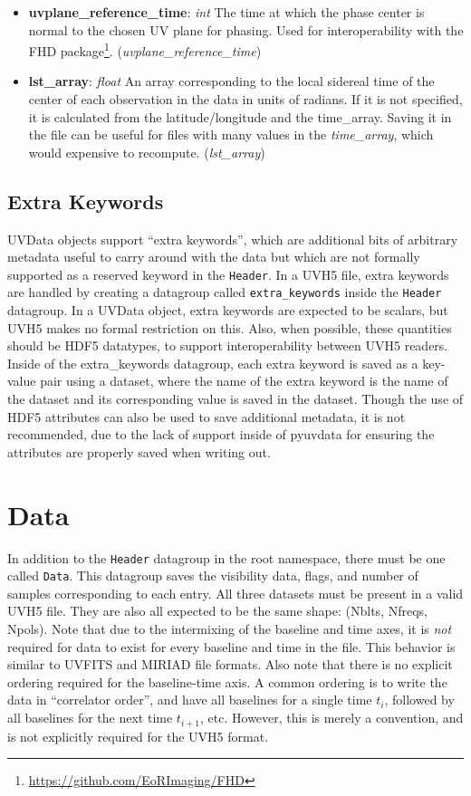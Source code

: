 \documentclass[11pt, oneside]{article}
\begin{document}
\begin{itemize}
\item \textbf{uvplane\_reference\_time}: \textit{int} The time at which the
  phase center is normal to the chosen UV plane for phasing. Used for
  interoperability with the FHD
  package\footnote{\url{https://github.com/EoRImaging/FHD}}. (\textit{uvplane\_reference\_time})
\item \textbf{lst\_array}: \textit{float} An array corresponding to the local
  sidereal time of the center of each observation in the data in units of
  radians. If it is not specified, it is calculated from the latitude/longitude
  and the time\_array. Saving it in the file can be useful for files with many
  values in the \textit{time\_array}, which would expensive to
  recompute. (\textit{lst\_array})
\end{itemize}

\subsection{Extra Keywords}
\label{sec:extra_keywords}
UVData objects support ``extra keywords'', which are additional bits of
arbitrary metadata useful to carry around with the data but which are not
formally supported as a reserved keyword in the \verb+Header+. In a UVH5 file,
extra keywords are handled by creating a datagroup called \verb+extra_keywords+
inside the \verb+Header+ datagroup. In a UVData object, extra keywords are
expected to be scalars, but UVH5 makes no formal restriction on this. Also, when
possible, these quantities should be HDF5 datatypes, to support interoperability
between UVH5 readers. Inside of the extra\_keywords datagroup, each extra
keyword is saved as a key-value pair using a dataset, where the name of the
extra keyword is the name of the dataset and its corresponding value is saved in
the dataset. Though the use of HDF5 attributes can also be used to save
additional metadata, it is not recommended, due to the lack of support inside of
pyuvdata for ensuring the attributes are properly saved when writing out.


\section{Data}
\label{sec:data}
In addition to the \verb+Header+ datagroup in the root namespace, there must be
one called \verb+Data+. This datagroup saves the visibility data, flags, and
number of samples corresponding to each entry. All three datasets must be
present in a valid UVH5 file. They are also all expected to be the same shape:
(Nblts, Nfreqs, Npols). Note that due to the intermixing of the baseline and
time axes, it is \textit{not} required for data to exist for every baseline and
time in the file. This behavior is similar to UVFITS and MIRIAD file
formats. Also note that there is no explicit ordering required for the
baseline-time axis. A common ordering is to write the data in ``correlator
order'', and have all baselines for a single time $t_i$, followed by all
baselines for the next time $t_{i+1}$, etc. However, this is merely a
convention, and is not explicitly required for the UVH5 format.
\end{document}
